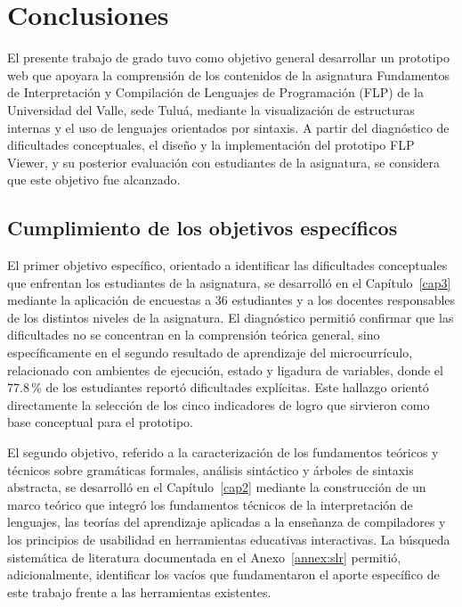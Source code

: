 \section{Conclusiones}

El presente trabajo de grado tuvo como objetivo general desarrollar un prototipo web que apoyara la comprensión de los contenidos de la asignatura Fundamentos de Interpretación y Compilación de Lenguajes de Programación (FLP) de la Universidad del Valle, sede Tuluá, mediante la visualización de estructuras internas y el uso de lenguajes orientados por sintaxis. A partir del diagnóstico de dificultades conceptuales, el diseño y la implementación del prototipo FLP Viewer, y su posterior evaluación con estudiantes de la asignatura, se considera que este objetivo fue alcanzado.

\subsection{Cumplimiento de los objetivos específicos}

El primer objetivo específico, orientado a identificar las dificultades conceptuales que enfrentan los estudiantes de la asignatura, se desarrolló en el Capítulo~\ref{cap3} mediante la aplicación de encuestas a 36 estudiantes y a los docentes responsables de los distintos niveles de la asignatura. El diagnóstico permitió confirmar que las dificultades no se concentran en la comprensión teórica general, sino específicamente en el segundo resultado de aprendizaje del microcurrículo, relacionado con ambientes de ejecución, estado y ligadura de variables, donde el 77.8\,\% de los estudiantes reportó dificultades explícitas. Este hallazgo orientó directamente la selección de los cinco indicadores de logro que sirvieron como base conceptual para el prototipo.

El segundo objetivo, referido a la caracterización de los fundamentos teóricos y técnicos sobre gramáticas formales, análisis sintáctico y árboles de sintaxis abstracta, se desarrolló en el Capítulo~\ref{cap2} mediante la construcción de un marco teórico que integró los fundamentos técnicos de la interpretación de lenguajes, las teorías del aprendizaje aplicadas a la enseñanza de compiladores y los principios de usabilidad en herramientas educativas interactivas. La búsqueda sistemática de literatura documentada en el Anexo~\ref{annex:slr} permitió, adicionalmente, identificar los vacíos que fundamentaron el aporte específico de este trabajo frente a las herramientas existentes.

